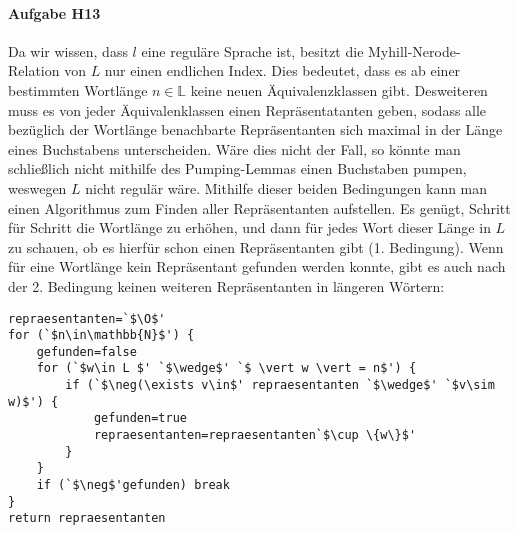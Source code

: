\documentclass[11pt]{article}
\begin{document}


%
%
\paragraph{Aufgabe H13}
Da wir wissen, dass $l$ eine reguläre Sprache ist, besitzt die Myhill-Nerode-Relation von $L$ nur einen endlichen Index. Dies bedeutet, dass es ab einer bestimmten Wortlänge $n\in\mathbb{L}$ keine neuen Äquivalenzklassen gibt. Desweiteren muss es von jeder Äquivalenklassen einen Repräsentatanten geben, sodass alle bezüglich der Wortlänge benachbarte Repräsentanten sich maximal in der Länge eines Buchstabens unterscheiden. Wäre dies nicht der Fall, so könnte man schließlich nicht mithilfe des Pumping-Lemmas einen Buchstaben pumpen, weswegen $L$ nicht regulär wäre. Mithilfe dieser beiden Bedingungen kann man einen Algorithmus zum Finden aller Repräsentanten aufstellen. Es genügt, Schritt für Schritt die Wortlänge zu erhöhen, und dann für jedes Wort dieser Länge in $L$ zu schauen, ob es hierfür schon einen Repräsentanten gibt (1. Bedingung). Wenn für eine Wortlänge kein Repräsentant gefunden werden konnte, gibt es auch nach der 2. Bedingung keinen weiteren Repräsentanten in längeren Wörtern:
\begin{lstlisting}[escapeinside=`']
repraesentanten=`$\O$'
for (`$n\in\mathbb{N}$') {
	gefunden=false
	for (`$w\in L $' `$\wedge$' `$ \vert w \vert = n$') {
		if (`$\neg(\exists v\in$' repraesentanten `$\wedge$' `$v\sim w)$') {
			gefunden=true
			repraesentanten=repraesentanten`$\cup \{w\}$'
		}
	}
	if (`$\neg$'gefunden) break
}
return repraesentanten
\end{lstlisting}

%
%
\end{document}

